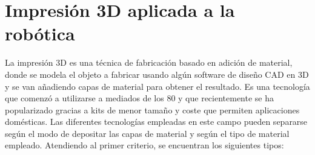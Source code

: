 \section{Impresión 3D aplicada a la robótica}
\label{impresion_3D}

La impresión 3D es una técnica de fabricación basado en adición de material, donde se modela el objeto a fabricar usando algún software de diseño CAD en 3D y se van añadiendo capas de material para obtener el resultado. Es una tecnología que comenzó a utilizarse a mediados de los 80 y que recientemente se ha popularizado gracias a kits de menor tamaño y coste que permiten aplicaciones domésticas. Las diferentes tecnologías empleadas en este campo pueden separarse según el modo de depositar las capas de material y según el tipo de material empleado. Atendiendo al primer criterio, se encuentran  los siguientes tipos:\\

